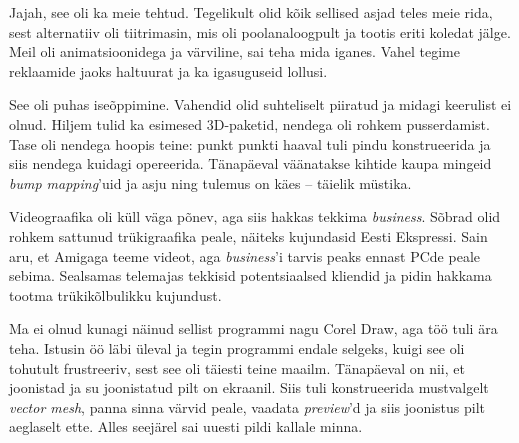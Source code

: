 
Jajah, see oli ka meie tehtud. Tegelikult olid kõik sellised asjad teles meie 
rida, sest alternatiiv oli tiitrimasin, mis oli poolanaloogpult 
ja tootis eriti koledat jälge. Meil oli 
animatsioonidega ja värviline, sai teha mida iganes. Vahel tegime reklaamide 
jaoks
haltuurat ja ka igasuguseid lollusi.


See oli puhas iseõppimine. Vahendid olid suhteliselt 
piiratud ja midagi keerulist ei olnud. Hiljem tulid ka 
esimesed 3D-paketid, nendega oli rohkem pusserdamist. Tase oli nendega hoopis 
teine: punkt punkti haaval tuli pindu konstrueerida ja 
siis nendega kuidagi opereerida. Tänapäeval väänatakse kihtide kaupa mingeid 
\emph{bump mapping}'uid ja 
asju ning tulemus on käes -- täielik müstika. 


Videograafika oli küll väga põnev, aga siis hakkas tekkima 
\emph{business}. Sõbrad olid rohkem sattunud 
trükigraafika peale, näiteks kujundasid Eesti Ekspressi. Sain aru, et Amigaga 
teeme 
videot, aga \emph{business}'i tarvis peaks ennast 
PCde peale sebima. Sealsamas telemajas tekkisid 
potentsiaalsed kliendid ja pidin hakkama tootma trükikõlbulikku kujundust. 

Ma ei olnud kunagi näinud sellist programmi nagu Corel Draw, 
aga töö tuli ära teha. Istusin öö läbi üleval ja tegin programmi endale 
selgeks, kuigi see oli tohutult frustreeriv, sest see oli täiesti teine maailm. 
Tänapäeval on nii, et joonistad ja su joonistatud pilt on ekraanil. Siis 
tuli konstrueerida mustvalgelt \emph{vector 
mesh}, panna sinna värvid peale, vaadata \emph{preview}'d ja siis 
joonistus pilt aeglaselt ette. Alles seejärel sai uuesti 
pildi kallale minna.


